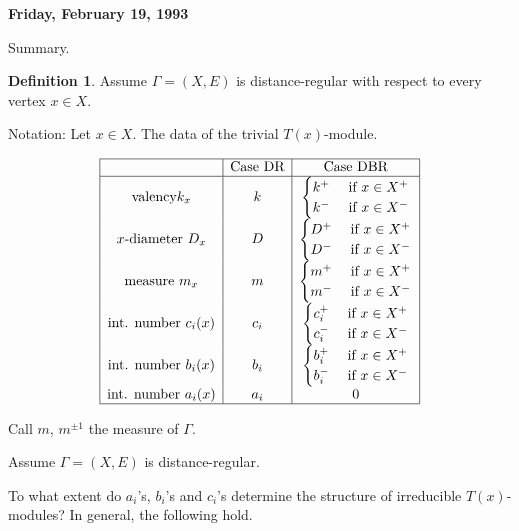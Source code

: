 \documentclass[
]{book}
\theoremstyle{definition}
\newtheorem{definition}{Definition}[chapter]
\theoremstyle{definition}
\theoremstyle{definition}
\theoremstyle{definition}
\theoremstyle{remark}
\begin{document}
\textbf{Friday, February 19, 1993}

Summary.

\begin{definition}
Assume \(\Gamma = (X, E)\) is distance-regular with respect to every vertex \(x\in X\).

Notation: Let \(x\in X\). The data of the trivial \(T(x)\)-module.

\[\begin{array}{|c|c|c|}
\hline
& \text{Case DR}  & \text{Case DBR} \\
\hline
\text{valency} k_x & k & \begin{cases} k^+ & \text{ if } x\in X^+\\
k^- & \text{ if } x\in X^-\end{cases}\\
x\text{-diameter } D_x & D & \begin{cases} D^+ & \text{ if } x\in X^+\\
D^- & \text{ if } x\in X^-\end{cases}\\
\text{measure $m_x$} & m & \begin{cases} m^+ & \text{ if } x\in X^+\\
m^- & \text{ if } x\in X^-\end{cases}\\
\text{int. number }c_i(x) & c_i & \begin{cases} c_i^+ & \text{ if } x\in X^+\\
c_i^- & \text{ if } x\in X^-\end{cases}\\ 
\text{int. number }b_i(x) & b_i & \begin{cases} b_i^+ & \text{ if } x\in X^+\\
b_i^- & \text{ if } x\in X^-\end{cases}\\ 
\text{int. number }a_i(x) & a_i & 0\\ 
\hline
\end{array}\]

Call \(m\), \(m^{\pm 1}\) the measure of \(\Gamma\).
\end{definition}

Assume \(\Gamma = (X, E)\) is distance-regular.

To what extent do \(a_i\)'s, \(b_i\)'s and \(c_i\)'s determine the structure of irreducible \(T(x)\)-modules? In general, the following hold.
\end{document}
